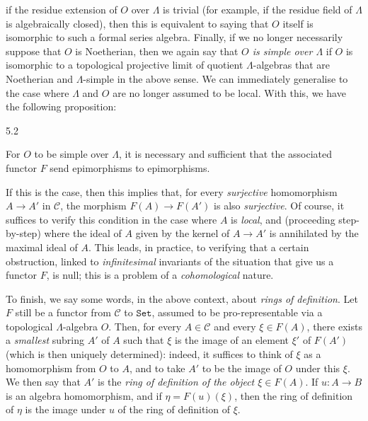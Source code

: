   if the residue extension of \(O\) over \(\Lambda \) is trivial (for example, if the residue field of \(\Lambda \) is algebraically closed), then this is equivalent to saying that \(O\) itself is isomorphic to such a formal series algebra.
  Finally, if we no longer necessarily suppose that \(O\) is Noetherian, then we again say that \emph{\(O\) is simple over \(\Lambda \)} if \(O\) is isomorphic to a topological projective limit of quotient \(\Lambda \)-algebras that are Noetherian and \(\Lambda \)-simple in the above sense.
  We can immediately generalise to the case where \(\Lambda \) and \(O\) are no longer assumed to be local.
  With this, we have the following proposition:\begin{proposition}{5.2}\label{fga3.ii-a.5-proposition-5.2}\skipsinglepar\par{}For \(O\) to be simple over \(\Lambda \), it is necessary and sufficient that the associated functor \(F\) send epimorphisms to epimorphisms.\end{proposition}\par{}If this is the case, then this implies that, for every \emph{surjective} homomorphism \(A\to  A'\) in \(\mathcal {C}\), the morphism \(F(A)\to  F(A')\) is also \emph{surjective}.
  Of course, it suffices to verify this condition in the case where \(A\) is \emph{local}, and (proceeding step-by-step) where the ideal of \(A\) given by the kernel of \(A\to  A'\) is annihilated by the maximal ideal of \(A\).
  This leads, in practice, to verifying that a certain obstruction, linked to \emph{infinitesimal} invariants of the situation that give us a functor \(F\), is null;
  this is a problem of a \emph{cohomological} nature.\par{}To finish, we say some words, in the above context, about \emph{rings of definition}.
  Let \(F\) still be a functor from \(\mathcal {C}\) to \(\mathtt {Set}\), assumed to be pro-representable via a topological \(\Lambda \)-algebra \(O\).
  Then, for every \(A\in \mathcal {C}\) and every \(\xi \in  F(A)\), there exists a \emph{smallest} subring \(A'\) of \(A\) such that \(\xi \) is the image of an element \(\xi '\) of \(F(A')\) (which is then uniquely determined):
  indeed, it suffices to think of \(\xi \) as a homomorphism from \(O\) to \(A\), and to take \(A'\) to be the image of \(O\) under this \(\xi \).
  We then say that \(A'\) is the \emph{ring of definition of the object \(\xi \in  F(A)\)}.
  If \(u\colon  A\to  B\) is an algebra homomorphism, and if \(\eta =F(u)(\xi )\), then the ring of definition of \(\eta \) is the image under \(u\) of the ring of definition of \(\xi \).
